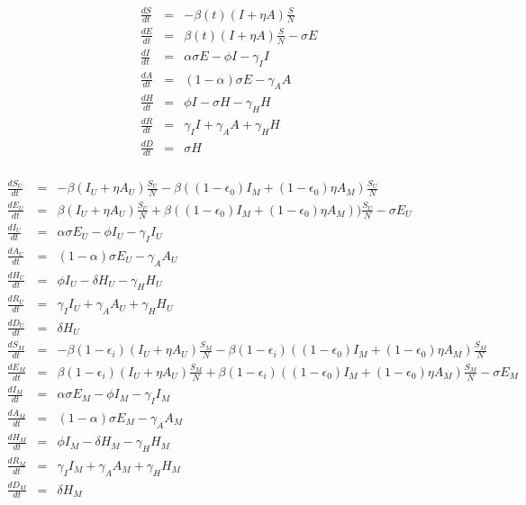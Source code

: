 \documentclass{article}
\begin{document}
\begin{minipage}{0.45\textwidth}
\begin{eqnarray}
  \frac{dS}{dt} &=& -\beta{(t)}(I+\eta A)\frac{S}{N}\nonumber\\
  \frac{dE}{dt} &=& \beta(t)(I+\eta A)\frac{S}{N}-\sigma{E}\nonumber\\
  \frac{dI}{dt} &=& \alpha\sigma{E}-\phi{I}-\gamma_{I}I\nonumber\\
  \frac{dA}{dt} &=& (1-\alpha)\sigma E-\gamma_{A}A\nonumber\\
  \frac{dH}{dt} &=& \phi I - \sigma H - \gamma_{H}H\nonumber\\
  \frac{dR}{dt} &=& \gamma_{I}{I} + \gamma_{A}{A}+\gamma_{H}{H}\nonumber\\
  \frac{dD}{dt} &=& \sigma H\nonumber\\
\end{eqnarray}
\end{minipage}
\begin{minipage}{0.35\textwidth}
\tiny
\begin{eqnarray}
  \frac{dS_{U}}{dt} &=& -\beta(I_{U}+\eta A_{U})\frac{S_{U}}{N}-\beta((1-\epsilon_{0})I_{M}+(1-\epsilon_{0})\eta A_{M})\frac{S_{U}}{N}\nonumber\\
  \frac{dE_{U}}{dt} &=& \beta(I_{U}+\eta{A}_{U})\frac{S_{U}}{N}+\beta((1-\epsilon_{0})I_{M}+(1-\epsilon_{0})\eta A_{M}))\frac{S_{U}}{N}-\sigma E_{U}\nonumber\\
  \frac{dI_{U}}{dt} &=& \alpha\sigma E_{U}-\phi I_{U} - \gamma_{I}I_{U}\nonumber\\
  \frac{dA_{U}}{dt} &=& (1-\alpha)\sigma E_{U}-\gamma_{A}A_{U}\nonumber\\
  \frac{dH_{U}}{dt} &=& \phi I_{U}-\delta H_{U}-\gamma_{H}H_{U}\nonumber\\
  \frac{dR_{U}}{dt} &=& \gamma_{I}I_{U}+\gamma_{A}A_{U}+\gamma_{H}H_{U}\nonumber\\
  \frac{dD_{U}}{dt} &=& \delta H_{U}\nonumber\\
  \frac{dS_{M}}{dt} &=& -\beta (1-\epsilon_{i})(I_{U}+\eta A_{U})\frac{S_{M}}{N}-\beta(1-\epsilon_{i})((1-\epsilon_{0})I_{M}+(1-\epsilon_{0})\eta A_{M})\frac{S_{M}}{N}\nonumber\\
  \frac{dE_{M}}{dt} &=& \beta(1-\epsilon_{i})(I_{U}+\eta A_{U})\frac{S_{M}}{N}+\beta(1-\epsilon_{i})((1-\epsilon_{0})I_{M}+(1-\epsilon_{0})\eta A_{M})\frac{S_{M}}{N}-\sigma E_{M}\nonumber\\
  \frac{dI_{M}}{dt} &=& \alpha\sigma E_{M}-\phi I_{M}-\gamma_{I} I_{M}\nonumber\\
  \frac{dA_{M}}{dt} &=& (1-\alpha)\sigma E_{M}-\gamma_{A}A_{M}\nonumber\\
  \frac{dH_{M}}{dt} &=& \phi I_{M}-\delta H_{M}-\gamma_{H} H_{M}\nonumber\\
  \frac{dR_{M}}{dt} &=& \gamma_{I}I_{M}+\gamma_{A}A_{M}+\gamma_{H}H_{M}\nonumber\\
  \frac{dD_{M}}{dt} &=& \delta H_{M}\nonumber\\
  \end{eqnarray}
\end{minipage}
\end{document}

